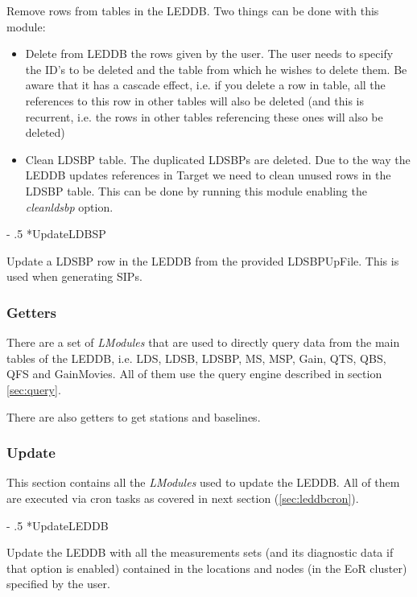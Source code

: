\documentclass[a4paper,11pt]{article}
\makeatletter
\renewcommand\paragraph{%
   \@startsection{paragraph}{4}{0mm}%
      {-\baselineskip}%
      {.5\baselineskip}%
      {\normalfont\normalsize\bfseries}}
\makeatother
\begin{document}
Remove rows from tables in the LEDDB. Two things can be done with this module:
\begin{itemize}
	\item Delete from LEDDB the rows given by the user. The user needs to specify the ID's to be deleted and the table from which he wishes to delete them. Be aware that it has a cascade effect, i.e. if you delete a row in table, all the references to this row in other tables will also be deleted (and this is recurrent, i.e. the rows in other tables referencing these ones will also be deleted)
	\item Clean LDSBP table. The duplicated LDSBPs are deleted. Due to the way the LEDDB updates references in Target we need to clean unused rows in the LDSBP table. This can be done by running this module enabling the \textit{cleanldsbp} option. 
\end{itemize}

\paragraph*{UpdateLDBSP}

Update a LDSBP row in the LEDDB from the provided LDSBPUpFile. This is used when generating SIPs.

\subsubsection{Getters}

There are a set of \textit{LModules} that are used to directly query data from the main tables of the LEDDB, i.e. LDS, LDSB, LDSBP, MS, MSP, Gain, QTS, QBS, QFS and GainMovies. All of them use the query engine described in section \ref{sec:query}.

There are also getters to get stations and baselines. 

\subsubsection{Update}

This section contains all the \textit{LModules} used to update the LEDDB. All of them are executed via cron tasks as covered in next section (\ref{sec:leddbcron}).

\paragraph*{UpdateLEDDB}

Update the LEDDB with all the measurements sets (and its diagnostic data if that option is enabled) contained in the locations and nodes (in the EoR cluster) specified by the user. 
\end{document}
